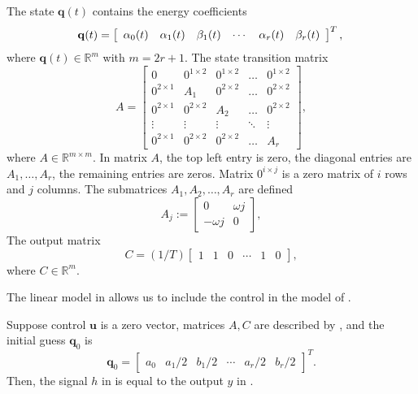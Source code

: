 The state $\mathbf{q}(t)$ contains the energy coefficients
\begin{equation}\label{eq:state-details}
  \mathbf{q}(t)=\left[\begin{array}{cccccc}
    \alpha_0(t) & \alpha_1(t) & \beta_1(t) & \cdots & \alpha_r(t) & \beta_r(t)
  \end{array}\right]^T,\\
\end{equation}
where $\mathbf{q}(t)\in\mathbb{R}^m$ with $m=2r+1$. The state transition matrix
\begin{equation}
  A=\left[\begin{array}{ccccc}
    0            & 0^{1\times 2}& 0^{1\times 2}& \dots& 0^{1\times 2} \\
    0^{2\times 1}& A_1          & 0^{2\times 2}& \dots& 0^{2\times 2} \\
    0^{2\times 1}& 0^{2\times 2}& A_2          & \dots& 0^{2\times 2} \\
    \vdots       & \vdots       & \vdots       &\ddots& \vdots        \\
    0^{2\times 1}& 0^{2\times 2}& 0^{2\times 2}& \dots& A_r 
  \end{array}\right],
\end{equation}
where $A\in\mathbb{R}^{m\times m}$. In matrix $A$, the top left entry is zero, the diagonal entries are $A_1,\dots,A_r$, the remaining entries are zeros. Matrix $0^{i\times j}$ is a zero matrix of $i$ rows and $j$ columns. The submatrices $A_1,A_2,\dots,A_r$ are defined
\begin{equation}
  A_j:=\begin{bmatrix}0 & \omega j \\ -\omega j & 0\end{bmatrix},
\end{equation}
The output matrix
\begin{equation}
  C=(1/T)\left[\begin{array}{cccccc}
    1 & 1 & 0 &\cdots & 1 & 0
  \end{array}\right],
\end{equation}
where $C\in\mathbb{R}^m$.

The linear model in  allows us to include the control in the model of .

\begin{highlight}
\begin{lem}\label{lem:eqv}Suppose control $\mathbf{u}$ is a zero vector, matrices $A,C$ are described by , and the initial guess $\mathbf{q}_0$ is 
  \begin{equation*}
  \mathbf{q}_0=\begin{bmatrix}a_0 & a_1/2 & b_1/2 & \cdots & a_r/2 & b_r/2\end{bmatrix}^T.
  \end{equation*} 
  Then, the signal $h$ in  is equal to the output $y$ in .
\end{lem}
\end{highlight}


